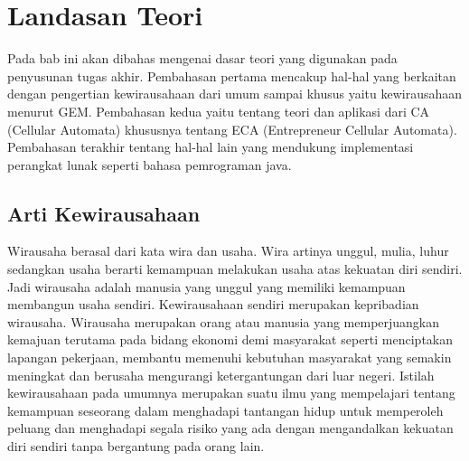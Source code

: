 \chapter{Landasan Teori}
\label{chap:teori}


 
Pada bab ini akan dibahas mengenai dasar teori yang digunakan pada penyusunan tugas akhir. Pembahasan pertama mencakup hal-hal yang berkaitan dengan pengertian kewirausahaan dari umum sampai khusus yaitu kewirausahaan menurut GEM. Pembahasan kedua yaitu tentang teori dan aplikasi dari CA (Cellular Automata) khususnya tentang ECA (Entrepreneur Cellular Automata). Pembahasan terakhir tentang hal-hal lain yang mendukung implementasi perangkat lunak seperti bahasa pemrograman java.


\section{Arti Kewirausahaan}
\label{sec:artiwirausaha}

\graphicspath{{images/}}

Wirausaha berasal dari kata wira dan usaha. Wira artinya unggul, mulia, luhur sedangkan usaha berarti kemampuan melakukan usaha atas kekuatan diri sendiri. Jadi wirausaha adalah manusia yang unggul yang memiliki kemampuan membangun usaha sendiri. Kewirausahaan sendiri merupakan kepribadian wirausaha. Wirausaha merupakan orang atau manusia yang memperjuangkan kemajuan terutama pada bidang ekonomi demi masyarakat seperti menciptakan lapangan pekerjaan, membantu memenuhi kebutuhan masyarakat yang semakin meningkat dan berusaha mengurangi ketergantungan dari luar negeri. Istilah kewirausahaan pada umumnya merupakan suatu ilmu yang mempelajari tentang kemampuan seseorang dalam menghadapi tantangan hidup untuk memperoleh peluang dan menghadapi segala risiko yang ada dengan mengandalkan kekuatan diri sendiri tanpa bergantung pada orang lain. \cite{artiwirausaha} 




